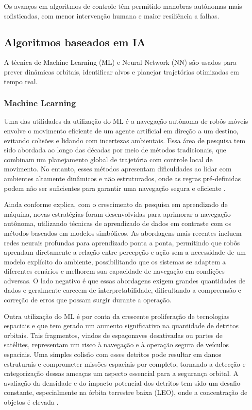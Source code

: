 Os avanços em algoritmos de controle têm permitido manobras autônomas mais sofisticadas, com menor intervenção humana e maior resiliência a falhas.

\subsection{Algoritmos baseados em IA}

A técnica de Machine Learning (ML) e Neural Network (NN) são usados para prever dinâmicas orbitais, identificar alvos e planejar trajetórias otimizadas em tempo real.

\subsubsection{Machine Learning}

Uma das utilidades da utilização do ML é a navegação autônoma de robôs móveis envolve o movimento eficiente de um agente artificial em direção a um destino, evitando colisões e lidando com incertezas ambientais. Essa área de pesquisa tem sido abordada ao longo das décadas por meio de métodos tradicionais, que combinam um planejamento global de trajetória com controle local de movimento. No entanto, esses métodos apresentam dificuldades ao lidar com ambientes altamente dinâmicos e não estruturados, onde as regras pré-definidas podem não ser suficientes para garantir uma navegação segura e eficiente \citep{xiao2022}.

Ainda conforme \citep{xiao2022} explica, com o crescimento da pesquisa em aprendizado de máquina, novas estratégias foram desenvolvidas para aprimorar a navegação autônoma, utilizando técnicas de aprendizado de dados em contraste com os métodos baseados em modelos simbólicos. As abordagens mais recentes incluem redes neurais profundas para aprendizado ponta a ponta, permitindo que robôs aprendam diretamente a relação entre percepção e ação sem a necessidade de um modelo explícito do ambiente, possibilitando que os sistemas se adaptem a diferentes cenários e melhorem sua capacidade de navegação em condições adversas. O lado negativo é que essas abordagens exigem grandes quantidades de dados e geralmente carecem de interpretabilidade, dificultando a compreensão e correção de erros que possam surgir durante a operação.

Outra utilização do ML é por conta da crescente proliferação de tecnologias espaciais e que tem gerado um aumento significativo na quantidade de detritos orbitais. Tais fragmentos, vindos de espaçonaves desativadas ou partes de satélites, representam um risco à navegação e à operação segura de veículos espaciais. Uma simples colisão com esses detritos pode resultar em danos estruturais e comprometer missões espaciais por completo, tornando a detecção e categorização dessas ameaças um aspecto essencial para a segurança orbital. A avaliação da densidade e do impacto potencial dos detritos tem sido um desafio constante, especialmente na órbita terrestre baixa (LEO), onde a concentração de objetos é elevada \citep{sri2024}.

